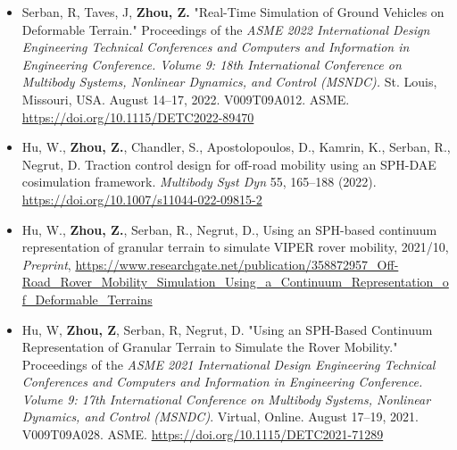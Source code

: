 



\begin{small}

\begin{itemize}[leftmargin=2ex, nosep, noitemsep]
	
	
	\item {Serban, R, Taves, J, \textbf{Zhou, Z.} "Real-Time Simulation of Ground Vehicles on Deformable Terrain." Proceedings of the \textit {ASME 2022 International Design Engineering Technical Conferences and Computers and Information in Engineering Conference. Volume 9: 18th International Conference on Multibody Systems, Nonlinear Dynamics, and Control (MSNDC).} St. Louis, Missouri, USA. August 14–17, 2022. V009T09A012. ASME. \url{https://doi.org/10.1115/DETC2022-89470}}
	\item {Hu, W., \textbf{Zhou, Z.}, Chandler, S., Apostolopoulos, D., Kamrin, K., Serban, R., Negrut, D. Traction control design for off-road mobility using an SPH-DAE cosimulation framework. \textit {Multibody Syst Dyn} 55, 165–188 (2022). \url{https://doi.org/10.1007/s11044-022-09815-2}}
	
	
	\item {Hu, W., \textbf{Zhou, Z.}, Serban, R., Negrut, D., Using an SPH-based continuum representation of granular terrain to simulate VIPER rover mobility, 2021/10, \textit{Preprint}, \url{https://www.researchgate.net/publication/358872957_Off-Road_Rover_Mobility_Simulation_Using_a_Continuum_Representation_of_Deformable_Terrains}}
	
	
	\item {Hu, W, \textbf{Zhou, Z}, Serban, R, Negrut, D. "Using an SPH-Based Continuum Representation of Granular Terrain to Simulate the Rover Mobility." Proceedings of the \textit{ASME 2021 International Design Engineering Technical Conferences and Computers and Information in Engineering Conference. Volume 9: 17th International Conference on Multibody Systems, Nonlinear Dynamics, and Control (MSNDC)}. Virtual, Online. August 17–19, 2021. V009T09A028. ASME. \url{https://doi.org/10.1115/DETC2021-71289}}

\end{itemize}
	
\end{small}


